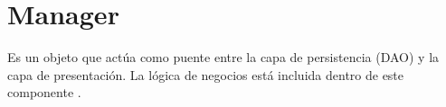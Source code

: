\section{Manager}

Es un objeto que actúa como puente entre la capa de persistencia (DAO) y la capa de presentación. La lógica de negocios está incluida dentro de este componente \cite{MNG0}. 
